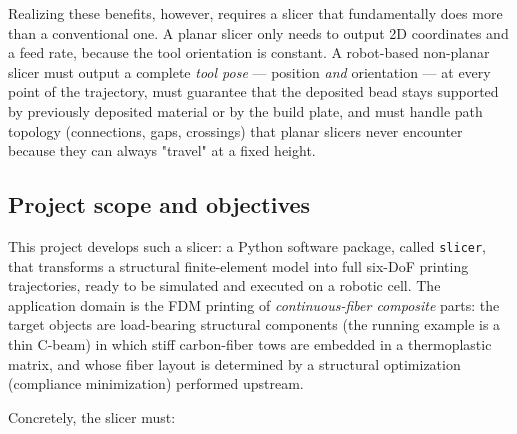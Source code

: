 Realizing these benefits, however, requires a slicer that fundamentally
does more than a conventional one. A planar slicer only needs to output
2D coordinates and a feed rate, because the tool orientation is
constant. A robot-based non-planar slicer must output a complete
\emph{tool pose} --- position \emph{and} orientation --- at every point
of the trajectory, must guarantee that the deposited bead stays
supported by previously deposited material or by the build plate, and
must handle path topology (connections, gaps, crossings) that planar
slicers never encounter because they can always "travel" at a fixed
height.

\subsection{Project scope and objectives}

This project develops such a slicer: a Python software package, called
\texttt{slicer}, that transforms a structural finite-element model into
full six-DoF printing trajectories, ready to be simulated and executed
on a robotic cell. The application domain is the FDM printing of
\emph{continuous-fiber composite} parts: the target objects are
load-bearing structural components (the running example is a thin
C-beam) in which stiff carbon-fiber tows are embedded in a
thermoplastic matrix, and whose fiber layout is determined by a
structural optimization (compliance minimization) performed upstream.

Concretely, the slicer must:

